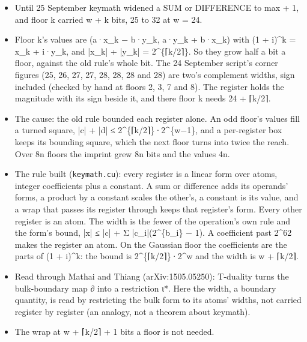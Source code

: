 \begin{itemize}
\begin{itemize}
\item Until 25 September keymath widened a SUM or DIFFERENCE to max + 1, and floor k carried w + k bits, 25 to 32 at w = 24.
\item Floor k's values are (a·x\_\allowbreak{}k − b·y\_\allowbreak{}k, a·y\_\allowbreak{}k + b·x\_\allowbreak{}k) with (1 + i)\textasciicircum{}k = x\_\allowbreak{}k + i·y\_\allowbreak{}k, and |x\_\allowbreak{}k| + |y\_\allowbreak{}k| = 2\textasciicircum{}\{⌈k/2⌉\}. So they grow half a bit a floor, against the old rule's whole bit. The 24 September script's corner figures (25, 26, 27, 27, 28, 28, 28 and 28) are two's complement widths, sign included (checked by hand at floors 2, 3, 7 and 8). The register holds the magnitude with its sign beside it, and there floor k needs 24 + ⌈k/2⌉.
\item The cause: the old rule bounded each register alone. An odd floor's values fill a turned square, |c| + |d| ≤ 2\textasciicircum{}\{⌈k/2⌉\}·2\textasciicircum{}\{w−1\}, and a per-register box keeps its bounding square, which the next floor turns into twice the reach. Over 8n floors the imprint grew 8n bits and the values 4n.
\item The rule built (\texttt{keymath.\allowbreak{}cu}): every register is a linear form over atoms, integer coefficients plus a constant. A sum or difference adds its operands' forms, a product by a constant scales the other's, a constant is its value, and a wrap that passes its register through keeps that register's form. Every other register is an atom. The width is the fewer of the operation's own rule and the form's bound, |x| ≤ |c| + Σ |c\_\allowbreak{}i|(2\textasciicircum{}\{b\_\allowbreak{}i\} − 1). A coefficient past 2\textasciicircum{}62 makes the register an atom. On the Gaussian floor the coefficients are the parts of (1 + i)\textasciicircum{}k: the bound is 2\textasciicircum{}\{⌈k/2⌉\}·2\textasciicircum{}w and the width is w + ⌈k/2⌉.
\item Read through Mathai and Thiang (arXiv:1505.05250): T-duality turns the bulk-boundary map ∂ into a restriction ι*. Here the width, a boundary quantity, is read by restricting the bulk form to its atoms' widths, not carried register by register (an analogy, not a theorem about keymath).
\item The wrap at w + ⌈k/2⌉ + 1 bits a floor is not needed.
\end{itemize}

\end{itemize}
